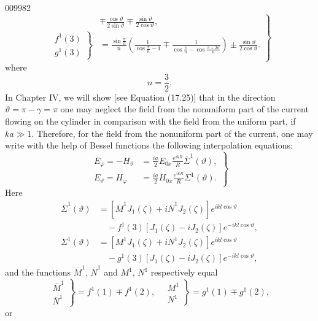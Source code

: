 \begin{scanpage}{0099}{82}
\[
\left.\begin{aligned}
&\mp\frac{\cos\vartheta}{2\sin\vartheta}\mp\frac{\sin\vartheta}{2\cos\vartheta},\\
\left.\begin{matrix}f^1(3)\\g^1(3)\end{matrix}\right\}
&=\frac{\sin\frac\pi n}n\left(\frac1{\cos\frac\pi n-1}\mp\frac1{\cos\frac\pi n-\cos\frac{\pi+2\vartheta}n}\right)\pm\frac{\sin\vartheta}{2\cos\vartheta}.
\end{aligned}\right\}\tag{14.03}
\]
where
\[n=\frac32.\tag{14.04}\]
In Chapter IV, we will show [see Equation (17.25)] that in the direction $\vartheta=\pi-\gamma=\pi$ one may neglect the field from the nonuniform part of the current flowing on the cylinder in comparison with the field from the uniform part, if $ka\gg1$. Therefore, for the field from the nonuniform part of the current, one may write with the help of Bessel functions the following interpolation equations:
\[\left.\begin{aligned}E_\varphi=-H_\vartheta&=\frac{ia}2E_{0x}\frac{e^{ikR}}R\overline\Sigma^1(\vartheta),\\E_\vartheta=H_\varphi&=\frac{ia}2H_{0x}\frac{e^{ikR}}R\Sigma^1(\vartheta).\end{aligned}\right\}\tag{14.05}\]
Here
\[\begin{aligned}\overline\Sigma^1(\vartheta)&=[\overline M^1J_1(\zeta)+i\overline N^1J_2(\zeta)]e^{ikl\cos\vartheta}\\&\quad-f^1(3)[J_1(\zeta)-iJ_2(\zeta)]e^{-ikl\cos\vartheta},\\\Sigma^1(\vartheta)&=[M^1J_1(\zeta)+iN^1J_2(\zeta)]e^{ikl\cos\vartheta}\\&\quad-g^1(3)[J_1(\zeta)-iJ_2(\zeta)]e^{-ikl\cos\vartheta},\end{aligned}\tag{14.06}\]
and the functions $\overline M^1$, $\overline N^1$ and $M^1$, $N^1$ respectively equal
\[\left.\begin{matrix}\overline M^1\\\overline N^1\end{matrix}\right\}=f^1(1)\mp f^1(2),\quad\left.\begin{matrix}M^1\\N^1\end{matrix}\right\}=g^1(1)\mp g^1(2),\tag{14.07}\]
or
\end{scanpage}
